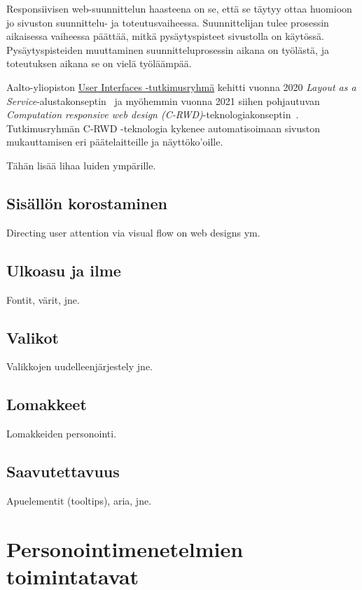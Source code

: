 \documentclass[finnish, 12pt, a4paper, elec, utf8, a-1b, online]{aaltothesis}
\begin{document}
Responsiivisen web-suunnittelun haasteena on se, että se täytyy ottaa
huomioon jo sivuston suunnittelu- ja toteutusvaiheessa. Suunnittelijan tulee
prosessin aikaisessa vaiheessa päättää, mitkä pysäytyspisteet sivustolla on
käytössä. Pysäytyspisteiden muuttaminen suunnitteluprosessin aikana on työlästä,
ja toteutuksen aikana se on vielä työläämpää.

Aalto-yliopiston \href{https://userinterfaces.aalto.fi/}{User Interfaces
-tutkimusryhmä} kehitti vuonna 2020 \textit{Layout as a
Service}-alustakonseptin~\cite{laine2020_laas} ja myöhemmin vuonna 2021 siihen
pohjautuvan \textit{Computation responsive web design
(C-RWD)}-teknologiakonseptin~\cite{laine2021responsive}. Tutkimusryhmän C-RWD
-teknologia kykenee automatisoimaan sivuston mukauttamisen eri päätelaitteille
ja näyttöko'oille.

Tähän lisää lihaa luiden ympärille.

\subsection*{Sisällön korostaminen}

Directing user attention via visual flow on web designs ym.

\subsection{Ulkoasu ja ilme}

Fontit, värit, jne.

\subsection{Valikot}\label{menus}

Valikkojen uudelleenjärjestely jne.

\subsection{Lomakkeet}

Lomakkeiden personointi.

\subsection{Saavutettavuus}

Apuelementit (tooltips), aria, jne.

\clearpage

\section{Personointimenetelmien toimintatavat}
\end{document}
